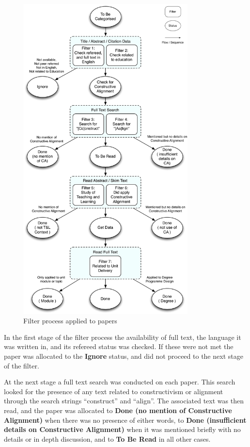 \begin{figure}[tbph]
	\centering
	\includegraphics[width=0.8\textwidth]{FilterProcess}
	\caption{Filter process applied to papers}
	\label{fig:filter_proc}
\end{figure}

In the first stage of the filter process the availability of full text, the language it was written in, and its refereed status was checked. If these were not met the paper was allocated to the \textbf{Ignore} status, and did not proceed to the next stage of the filter. 

At the next stage a full text search was conducted on each paper. This search looked for the presence of any text related to constructivism or alignment through the search strings ``construct'' and ``align''. The associated text was then read, and the paper was allocated to \textbf{Done (no mention of Constructive Alignment)} when there was no presence of either words, to \textbf{Done (insufficient details on Constructive Alignment)} when it was mentioned briefly with no details or in depth discussion, and to \textbf{To Be Read} in all other cases. %

